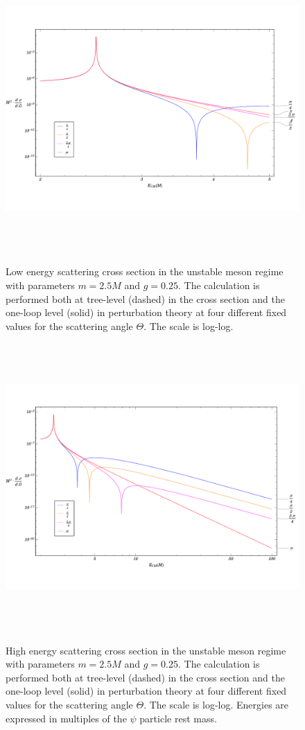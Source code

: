 \documentclass[12pt]{extarticle}
\begin{document}
\begin{figure}
\begin{center}
\vspace*{-2cm}
\includegraphics[width=15cm, height=11cm]{UnStableMeson-LowEnergy}
\caption{Low energy scattering cross section in the unstable meson regime with parameters $m = 2.5 M$ and $g = 0.25$. The calculation is performed both at tree-level (dashed) in the cross section and the one-loop level (solid) in perturbation theory at four different fixed values for the scattering angle $\Theta$. The scale is log-log.} 
\label{UnStabLowEnergy}
\includegraphics[width=15cm, height=11cm]{UnStableMeson-HighEnergy}
\caption{High energy scattering cross section in the unstable meson regime with parameters $m = 2.5 M$ and $g = 0.25$. The calculation is performed both at tree-level (dashed) in the cross section and the one-loop level (solid) in perturbation theory at four different fixed values for the scattering angle $\Theta$. The scale is log-log. Energies are expressed in multiples of the $\psi$ particle rest mass.} 
\label{UnStabHighEnergy}
\end{center}
\end{figure} 
\end{document}
